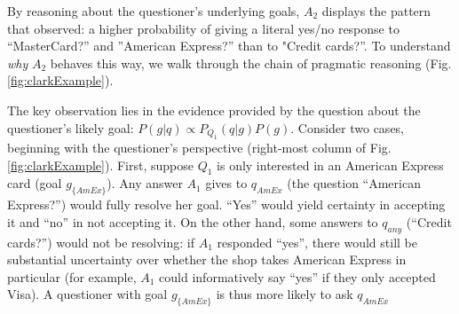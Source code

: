 \documentclass[12pt, floatsintext, jou]{apa6}
\begin{document}
By reasoning about the questioner's underlying goals, $A_2$ displays the pattern that  observed: a higher probability of giving a literal yes/no response to ``MasterCard?'' and ''American Express?'' than to "Credit cards?''. To understand \emph{why} $A_2$ behaves this way, we walk through the chain of pragmatic reasoning (Fig. \ref{fig:clarkExample}).

The key observation lies in the evidence provided by the question about the questioner's likely goal: $P(g | q) \propto P_{Q_1}(q|g)P(g)$. Consider two cases, beginning with the questioner's perspective  (right-most column of Fig. \ref{fig:clarkExample}). First, suppose $Q_1$ is only interested in an American Express card (goal $g_{\{AmEx\}}$). Any answer $A_1$ gives to $q_{AmEx}$ (the question ``American Express?'') would fully resolve her goal. ``Yes'' would yield certainty in accepting it and ``no'' in not accepting it. On the other hand, some answers to $q_{any}$ (``Credit cards?'') would not be resolving: if $A_1$ responded ``yes'', there would still be substantial uncertainty over whether the shop takes American Express in particular (for example, $A_1$ could informatively say ``yes'' if they only accepted Visa). A questioner with goal $g_{\{AmEx\}}$  is thus more likely to ask $q_{AmEx}$



\end{document}
